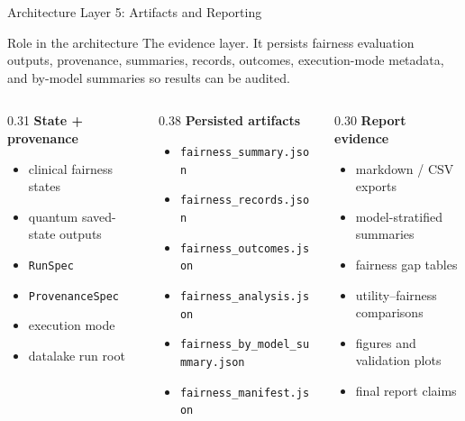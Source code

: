 \documentclass[aspectratio=169,10pt]{beamer}
\begin{document}
\begin{frame}{Architecture Layer 5: Artifacts and Reporting}
\small

\begin{block}{Role in the architecture}
The evidence layer. It persists fairness evaluation outputs, provenance, summaries, records, outcomes, execution-mode metadata, and by-model summaries so results can be audited.
\end{block}

\vspace{-0.1cm}

\begin{columns}[T]
\begin{column}{0.31\textwidth}
\textbf{\textcolor{phase4purple}{State + provenance}}
\begin{itemize}
    \item clinical fairness states
    \item quantum saved-state outputs
    \item \texttt{RunSpec}
    \item \texttt{ProvenanceSpec}
    \item execution mode
    \item datalake run root
\end{itemize}
\end{column}

\begin{column}{0.38\textwidth}
\textbf{\textcolor{phase4purple}{Persisted artifacts}}
\begin{itemize}
    \item \texttt{fairness\_summary.json}
    \item \texttt{fairness\_records.json}
    \item \texttt{fairness\_outcomes.json}
    \item \texttt{fairness\_analysis.json}
    \item \texttt{fairness\_by\_model\_summary.json}
    \item \texttt{fairness\_manifest.json}
\end{itemize}
\end{column}

\begin{column}{0.30\textwidth}
\textbf{\textcolor{phase4purple}{Report evidence}}
\begin{itemize}
    \item markdown / CSV exports
    \item model-stratified summaries
    \item fairness gap tables
    \item utility--fairness comparisons
    \item figures and validation plots
    \item final report claims
\end{itemize}
\end{column}
\end{columns}


\end{frame}
\end{document}

